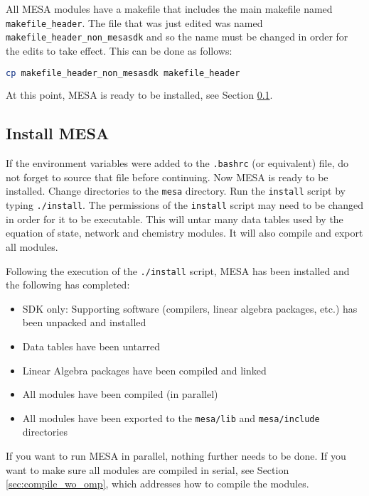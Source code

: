 All {\sf MESA} modules have a makefile that includes the main makefile named 
{\tt makefile\_header}. The file that was just edited was named 
{\tt makefile\_header\_non\_mesasdk} and so the name must be changed in order 
for the edits to take effect. This can be done as follows:
\begin{lstlisting}[language=bash,mathescape=false]
  cp makefile_header_non_mesasdk makefile_header
\end{lstlisting}

At this point, {\sf MESA} is ready to be installed, see Section 
\ref{sec:install}.


\subsection{Install {\sf MESA}}
\label{sec:install}
If the environment variables were added to the {\tt .bashrc} (or equivalent) 
file, do not forget to source that file before continuing. Now {\sf MESA} 
is ready to be installed. Change directories to the {\tt mesa} directory. 
Run the {\tt install} script by typing {\tt ./install}. The permissions of the 
{\tt install} script may need to be changed in order for it to be executable.
This will untar many data tables used by the equation of state, network and 
chemistry modules. It will also compile and export all modules.

Following the execution of the {\tt ./install} script, {\sf MESA} has been 
installed and the following has completed:
\begin{itemize}
\item SDK only: Supporting software (compilers, linear algebra packages, 
etc.) has been unpacked and installed
\item Data tables have been untarred
\item Linear Algebra packages have been compiled and linked
\item All modules have been compiled (in parallel)
\item All modules have been exported to the {\tt mesa/lib} and 
{\tt mesa/include} directories
\end{itemize}

If you want to run {\sf MESA} in parallel, nothing further needs to be done. 
If you want to make sure all modules are compiled in serial, see Section 
\ref{sec:compile_wo_omp}, which addresses how to compile the modules.

